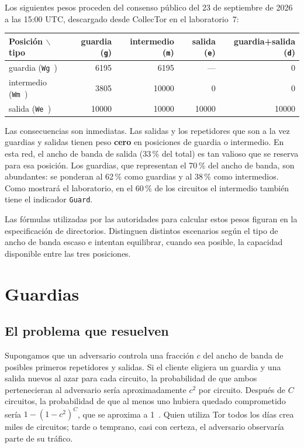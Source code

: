Los siguientes pesos proceden del consenso público del 23 de septiembre de 2026 a las 15:00 UTC, descargado desde CollecTor en el laboratorio~7:

\begin{center}
\begin{tabular}{lrrrr}
\toprule
Posición $\backslash$ tipo & guardia (\texttt{g}) & intermedio (\texttt{m}) & salida (\texttt{e}) & guardia+salida (\texttt{d}) \\
\midrule
guardia (\texttt{Wg\,}) & 6195 & 6195 & --- & 0 \\
intermedio (\texttt{Wm\,}) & 3805 & 10000 & 0 & 0 \\
salida (\texttt{We\,}) & 10000 & 10000 & 10000 & 10000 \\
\bottomrule
\end{tabular}
\end{center}

Las consecuencias son inmediatas. Las salidas y los repetidores que son a la vez guardias y salidas tienen peso \textbf{cero} en posiciones de guardia o intermedio. En esta red, el ancho de banda de salida (33\,\% del total) es tan valioso que se reserva para esa posición. Los guardias, que representan el 70\,\% del ancho de banda, son abundantes: se ponderan al 62\,\% como guardias y al 38\,\% como intermedios. Como mostrará el laboratorio, en el 60\,\% de los circuitos el intermedio también tiene el indicador \texttt{Guard}.

Las fórmulas utilizadas por las autoridades para calcular estos pesos figuran en la especificación de directorios. Distinguen distintos escenarios según el tipo de ancho de banda escaso e intentan equilibrar, cuando sea posible, la capacidad disponible entre las tres posiciones.

\section{Guardias}\label{sec:guard}

\subsection{El problema que resuelven}

Supongamos que un adversario controla una fracción $c$ del ancho de banda de posibles primeros repetidores y salidas. Si el cliente eligiera un guardia y una salida nuevos al azar para cada circuito, la probabilidad de que ambos pertenecieran al adversario sería aproximadamente $c^2$ por circuito. Después de $C$ circuitos, la probabilidad de que al menos uno hubiera quedado comprometido sería $1-(1-c^2)^C$, que se aproxima a 1~. Quien utiliza Tor todos los días crea miles de circuitos; tarde o temprano, casi con certeza, el adversario observaría parte de su tráfico.

